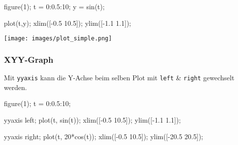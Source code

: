 \documentclass[
  10pt,
  a4paper,
  twocolumn]{article}
\newenvironment{Shaded}{}{}
\newcommand{\FloatTok}[1]{\textcolor[rgb]{0.00,0.36,0.77}{#1}}
\newcommand{\NormalTok}[1]{\textcolor[rgb]{0.14,0.16,0.18}{#1}}
\newcommand{\OperatorTok}[1]{\textcolor[rgb]{0.14,0.16,0.18}{#1}}
\newcommand{\VariableTok}[1]{\textcolor[rgb]{0.89,0.38,0.04}{#1}}
\numberwithin{equation}{section}
\begin{document}
\begin{Shaded}
\begin{Highlighting}[]
\VariableTok{figure}\NormalTok{(}\FloatTok{1}\NormalTok{)}\OperatorTok{;}
\VariableTok{t} \OperatorTok{=} \FloatTok{0}\OperatorTok{:}\FloatTok{0.5}\OperatorTok{:}\FloatTok{10}\OperatorTok{;}
\VariableTok{y} \OperatorTok{=} \VariableTok{sin}\NormalTok{(}\VariableTok{t}\NormalTok{)}\OperatorTok{;}

\VariableTok{plot}\NormalTok{(}\VariableTok{t}\OperatorTok{,}\VariableTok{y}\NormalTok{)}\OperatorTok{;}
\VariableTok{xlim}\NormalTok{([}\OperatorTok{{-}}\FloatTok{0.5} \FloatTok{10.5}\NormalTok{])}\OperatorTok{;}
\VariableTok{ylim}\NormalTok{([}\OperatorTok{{-}}\FloatTok{1.1} \FloatTok{1.1}\NormalTok{])}\OperatorTok{;}
\end{Highlighting}
\end{Shaded}

\texttt{[image: images/plot\_simple.png]}

\subsubsection{XYY-Graph}\label{xyy-graph}

Mit \texttt{yyaxis} kann die Y-Achse beim selben Plot mit \texttt{left}
\& \texttt{right} gewechselt werden.

\begin{Shaded}
\begin{Highlighting}[]
\VariableTok{figure}\NormalTok{(}\FloatTok{1}\NormalTok{)}\OperatorTok{;}
\VariableTok{t} \OperatorTok{=} \FloatTok{0}\OperatorTok{:}\FloatTok{0.5}\OperatorTok{:}\FloatTok{10}\OperatorTok{;}

\VariableTok{yyaxis} \VariableTok{left}\OperatorTok{;}
\VariableTok{plot}\NormalTok{(}\VariableTok{t}\OperatorTok{,} \VariableTok{sin}\NormalTok{(}\VariableTok{t}\NormalTok{))}\OperatorTok{;}
\VariableTok{xlim}\NormalTok{([}\OperatorTok{{-}}\FloatTok{0.5} \FloatTok{10.5}\NormalTok{])}\OperatorTok{;}
\VariableTok{ylim}\NormalTok{([}\OperatorTok{{-}}\FloatTok{1.1} \FloatTok{1.1}\NormalTok{])}\OperatorTok{;}

\VariableTok{yyaxis} \VariableTok{right}\OperatorTok{;}
\VariableTok{plot}\NormalTok{(}\VariableTok{t}\OperatorTok{,} \FloatTok{20}\OperatorTok{*}\VariableTok{cos}\NormalTok{(}\VariableTok{t}\NormalTok{))}\OperatorTok{;}
\VariableTok{xlim}\NormalTok{([}\OperatorTok{{-}}\FloatTok{0.5} \FloatTok{10.5}\NormalTok{])}\OperatorTok{;}
\VariableTok{ylim}\NormalTok{([}\OperatorTok{{-}}\FloatTok{20.5} \FloatTok{20.5}\NormalTok{])}\OperatorTok{;}
\end{Highlighting}
\end{Shaded}
\end{document}
